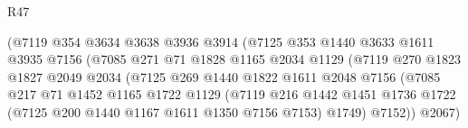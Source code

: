 \begin{lexlean}{R47}
\begin{coremodule}
                                      (@7119
                                        @354
                                        @3634
                                        @3638
                                        @3936
                                        @3914
                                        (@7125
                                          @353
                                          @1440
                                          @3633
                                          @1611
                                          @3935
                                          @7156
                                          (@7085
                                            @271
                                            @71
                                            @1828
                                            @1165
                                            @2034
                                            @1129
                                            (@7119
                                              @270
                                              @1823
                                              @1827
                                              @2049
                                              @2034
                                              (@7125
                                                @269
                                                @1440
                                                @1822
                                                @1611
                                                @2048
                                                @7156
                                                (@7085
                                                  @217
                                                  @71
                                                  @1452
                                                  @1165
                                                  @1722
                                                  @1129
                                                  (@7119
                                                    @216
                                                    @1442
                                                    @1451
                                                    @1736
                                                    @1722
                                                    (@7125 @200 @1440 @1167 @1611 @1350 @7156 @7153)
                                                    @1749)
                                                  @7152))
                                              @2067)

\end{coremodule}
\end{lexlean}
